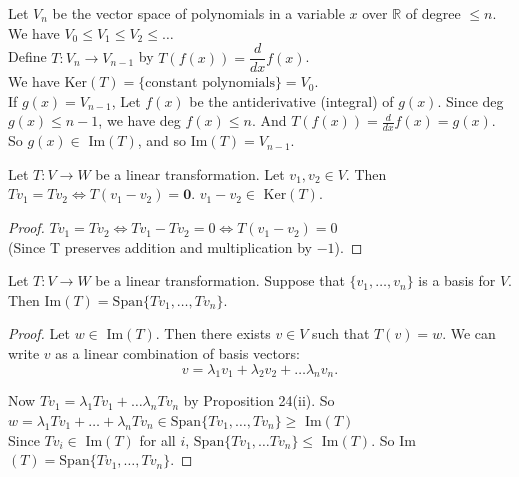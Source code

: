 \documentclass[twoside]{scrartcl}
\begin{document}
\begin{example} Let $V_n$ be the vector space of polynomials in a variable $x$ over $\mathbb{R}$ of degree $\leq n$.\\

We have $V_0 \leq V_1 \leq V_2 \leq \dots$\\

Define $T: V_n \to V_{n-1}$ by $T(f(x)) = \dfrac{d}{dx} f(x)$. \\

We have Ker$(T) = \{\text{constant polynomials} \} = V_0$.\\

If $g(x) = V_{n-1}$, Let $f(x)$ be the antiderivative (integral) of $g(x)$. Since deg $g(x) \leq n-1$, we have deg $f(x) \leq n$. And $T(f(x)) = \frac{d}{dx}f(x) = g(x)$. \\

So $g(x) \in $ Im$(T)$, and so Im$(T) = V_{n-1}$.
\end{example}\vspace*{10pt}

\begin{proposition} Let $T : V \to W$ be a linear transformation. Let $v_1, v_2 \in V$. Then $Tv_1 = Tv_2 \iff T(v_1 -v_2) = \mathbf{0}$. $v_1 - v_2 \in $ Ker$(T)$.	
\end{proposition}


\begin{proof}
$Tv_1 = Tv_2 \iff Tv_1 - Tv_2 = 0 \iff T(v_1 - v_2) = 0$\\ (Since T preserves addition and multiplication by $-1$). 
\end{proof} \vspace{10pt}

\begin{proposition} Let $T: V \to W$ be a linear transformation. Suppose that $\{v_1, \dots, v_n\}$ is a basis for $V$. Then Im$(T) = \text{Span}\{Tv_1, \dots, Tv_n\}$.	
\end{proposition}


\begin{proof}
Let $w \in $ Im$(T)$. Then there exists $v \in V$ such that $T(v) = w$. We can write $v$ as a linear combination of basis vectors:\[v = \lambda_1v_1 + \lambda_2v_2 + \dots \lambda_nv_n. \]

Now $Tv_1 = \lambda_1 Tv_1 + \dots \lambda_n Tv_n$ by Proposition 24(ii). So $w = \lambda_1Tv_1 + \dots + \lambda_nTv_n \in \text{Span}\{Tv_1, \dots, Tv_n\} \geq $ Im$(T)$\\
 
 Since $Tv_i \in $ Im$(T)$ for all $i$, $\text{Span}\{Tv_1, \dots Tv_n\} \leq $ Im$(T)$. So Im$(T) = \text{Span}\{Tv_1, \dots, Tv_n\}.$
 \end{proof}
\vspace{10pt}
\end{document}
